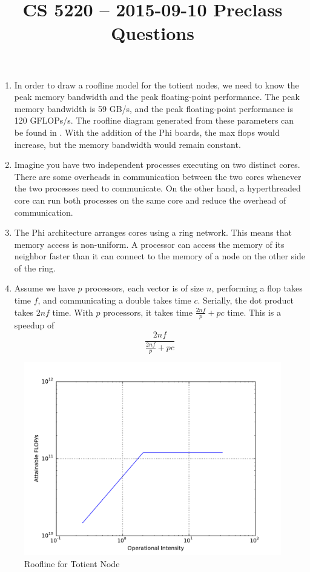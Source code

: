 \documentclass{hw}
\title{CS 5220 -- 2015-09-10 Preclass Questions}
\begin{document}
\maketitle{}

\begin{enumerate}
  \item
    In order to draw a roofline model for the totient nodes, we need to know
    the peak memory bandwidth and the peak floating-point performance. The peak
    memory bandwidth is 59 GB/s, and the peak floating-point performance is 120
    GFLOPs/s. The roofline diagram generated from these parameters can be found
    in . With the addition of the Phi boards, the max flops
    would increase, but the memory bandwidth would remain constant.

  \item
    Imagine you have two independent processes executing on two distinct cores.
    There are some overheads in communication between the two cores whenever
    the two processes need to communicate. On the other hand, a hyperthreaded
    core can run both processes on the same core and reduce the overhead of
    communication.

  \item
   The Phi architecture arranges cores using a ring network. This means that
   memory access is non-uniform. A processor can access the memory of its
   neighbor faster than it can connect to the memory of a node on the other
   side of the ring.

  \item
    Assume we have $p$ processors, each vector is of size $n$, performing a
    flop takes time $f$, and communicating a double takes time $c$. Serially,
    the dot product takes $2nf$ time. With $p$ processors, it takes time
    $\frac{2nf}{p} + pc$ time. This is a speedup of
    \[
      \frac{2nf}{\frac{2nf}{p} + pc}
    \]
\end{enumerate}

\begin{figure}[p]
  \centering
  \includegraphics[width=\textwidth]{roofline.pdf}
  \caption{Roofline for Totient Node}
  \label{fig:roofline}
\end{figure}
\end{document}
